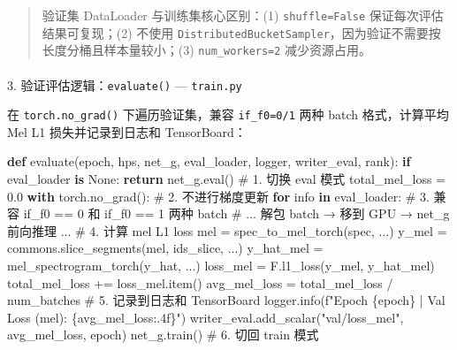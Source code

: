 \documentclass[
  english,
  letterpaper,
  DIV=11,
  numbers=noendperiod]{scrartcl}
\makeatletter
\let\oldparagraph\paragraph
\renewcommand{\paragraph}{
    \@ifstar
      \xxxParagraphStar
      \xxxParagraphNoStar
  }
\newcommand{\xxxParagraphStar}[1]{\oldparagraph*{#1}\mbox{}}
\newcommand{\xxxParagraphNoStar}[1]{\oldparagraph{#1}\mbox{}}
\newenvironment{Shaded}{\begin{snugshade}}{\end{snugshade}}
\newcommand{\BuiltInTok}[1]{\textcolor[rgb]{0.00,0.23,0.31}{#1}}
\newcommand{\CommentTok}[1]{\textcolor[rgb]{0.37,0.37,0.37}{#1}}
\newcommand{\ControlFlowTok}[1]{\textcolor[rgb]{0.00,0.23,0.31}{\textbf{#1}}}
\newcommand{\FloatTok}[1]{\textcolor[rgb]{0.68,0.00,0.00}{#1}}
\newcommand{\KeywordTok}[1]{\textcolor[rgb]{0.00,0.23,0.31}{\textbf{#1}}}
\newcommand{\NormalTok}[1]{\textcolor[rgb]{0.00,0.23,0.31}{#1}}
\newcommand{\OperatorTok}[1]{\textcolor[rgb]{0.37,0.37,0.37}{#1}}
\newcommand{\SpecialCharTok}[1]{\textcolor[rgb]{0.37,0.37,0.37}{#1}}
\newcommand{\SpecialStringTok}[1]{\textcolor[rgb]{0.13,0.47,0.30}{#1}}
\newcommand{\StringTok}[1]{\textcolor[rgb]{0.13,0.47,0.30}{#1}}
\newcommand{\VariableTok}[1]{\textcolor[rgb]{0.07,0.07,0.07}{#1}}
\makeatother
\begin{document}
\begin{quote}
验证集 DataLoader 与训练集核心区别：(1) \texttt{shuffle=False}
保证每次评估结果可复现；(2) 不使用
\texttt{DistributedBucketSampler}，因为验证不需要按长度分桶且样本量较小；(3)
\texttt{num\_workers=2} 减少资源占用。
\end{quote}

\paragraph{\texorpdfstring{3. 验证评估逻辑：\texttt{evaluate()} ---
\texttt{train.py}}{3. 验证评估逻辑：evaluate() --- train.py}}\label{ux9a8cux8bc1ux8bc4ux4f30ux903bux8f91evaluate-train.py}

在 \texttt{torch.no\_grad()} 下遍历验证集，兼容 \texttt{if\_f0=0/1} 两种
batch 格式，计算平均 Mel L1 损失并记录到日志和 TensorBoard：

\begin{Shaded}
\begin{Highlighting}[]
\KeywordTok{def}\NormalTok{ evaluate(epoch, hps, net\_g, eval\_loader, logger, writer\_eval, rank):}
    \ControlFlowTok{if}\NormalTok{ eval\_loader }\KeywordTok{is} \VariableTok{None}\NormalTok{:}
        \ControlFlowTok{return}
\NormalTok{    net\_g.}\BuiltInTok{eval}\NormalTok{()                              }\CommentTok{\# 1. 切换 eval 模式}
\NormalTok{    total\_mel\_loss }\OperatorTok{=} \FloatTok{0.0}
    \ControlFlowTok{with}\NormalTok{ torch.no\_grad():                     }\CommentTok{\# 2. 不进行梯度更新}
        \ControlFlowTok{for}\NormalTok{ info }\KeywordTok{in}\NormalTok{ eval\_loader:}
            \CommentTok{\# 3. 兼容 if\_f0 == 0 和 if\_f0 == 1 两种 batch}
            \CommentTok{\# ... 解包 batch → 移到 GPU → net\_g 前向推理 ...}
            \CommentTok{\# 4. 计算 mel L1 loss}
\NormalTok{            mel }\OperatorTok{=}\NormalTok{ spec\_to\_mel\_torch(spec, ...)}
\NormalTok{            y\_mel }\OperatorTok{=}\NormalTok{ commons.slice\_segments(mel, ids\_slice, ...)}
\NormalTok{            y\_hat\_mel }\OperatorTok{=}\NormalTok{ mel\_spectrogram\_torch(y\_hat, ...)}
\NormalTok{            loss\_mel }\OperatorTok{=}\NormalTok{ F.l1\_loss(y\_mel, y\_hat\_mel)}
\NormalTok{            total\_mel\_loss }\OperatorTok{+=}\NormalTok{ loss\_mel.item()}
\NormalTok{    avg\_mel\_loss }\OperatorTok{=}\NormalTok{ total\_mel\_loss }\OperatorTok{/}\NormalTok{ num\_batches}
    \CommentTok{\# 5. 记录到日志和 TensorBoard}
\NormalTok{    logger.info(}\SpecialStringTok{f"Epoch }\SpecialCharTok{\{}\NormalTok{epoch}\SpecialCharTok{\}}\SpecialStringTok{ | Val Loss (mel): }\SpecialCharTok{\{}\NormalTok{avg\_mel\_loss}\SpecialCharTok{:.4f\}}\SpecialStringTok{"}\NormalTok{)}
\NormalTok{    writer\_eval.add\_scalar(}\StringTok{"val/loss\_mel"}\NormalTok{, avg\_mel\_loss, epoch)}
\NormalTok{    net\_g.train()                             }\CommentTok{\# 6. 切回 train 模式}
\end{Highlighting}
\end{Shaded}
\end{document}
